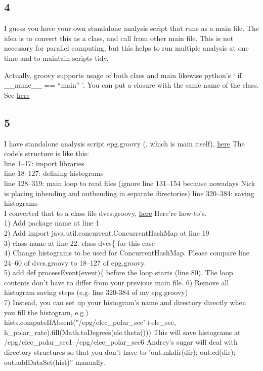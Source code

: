     \subsection{4}
        I guess you have your own standalone analysis script that runs as a main file.
        The idea is to convert this as a class, and call from other main file.
        This is not necessary for parallel computing, but this helps to run multiple analysis at one time and to maintain scripts tidy.
        
        Actually, groovy supports usage of both class and main likewise python’s ‘ if \_\_name\_\_ == “main” '.
        You can put a closure with the same name of the class. See \href{https://stackoverflow.com/questions/52543035/check-if-groovy-script-is-being-executed-directly}{here}
        
    \subsection{5}
        I have standalone analysis script epg.groovy (, which is main itself), \href{https://github.com/Sangbaek/analysis_code/blob/analysis/sangbaek/epg.groovy}{here}
        The code’s structure is like this:\\
        line 1–17: import libraries\\
        line 18–127: defining histograms\\
        line 128–319: main loop to read files (ignore line 131–154 because nowadays Nick is placing inbending and outbending in separate directories)
        line 320–384: saving histograms\\
        
        I converted that to a class file dvcs.groovy, \href{https://github.com/Sangbaek/analysis_code/blob/analysis/sangbaek/dvcs.groovy}{here}
        Here’re how-to’s.\\
        1) Add package name at line 1\\
        2) Add  import java.util.concurrent.ConcurrentHashMap at line 19\\
        3) class name at line 22. class dvcs\{ for this case\\
        4) Change histograms to be used for ConcurrentHashMap. Please compare line 24–60 of dvcs.groovy to 18–127 of epg.groovy.\\
        5) add def processEvent(event)\{ before the loop starts (line 80). The loop contents don’t have to differ from your previous main file.
        6) Remove all histogram saving steps (e.g. line 320-384 of my epg.groovy)\\
        7) Instead, you can set up your histogram's name and directory directly when you fill the histogram,
        e.g.) hists.computeIfAbsent("/epg/elec\_polar\_sec"+ele\_sec, h\_polar\_rate).fill(Math.toDegrees(ele.theta()))
        This will save histograms at /epg/elec\_polar\_sec1–/epg/elec\_polar\_sec6
        Andrey’s sugar will deal with directory structures so that you don’t have to "out.mkdir(dir); out.cd(dir); out.addDataSet(hist)” manually.
        
